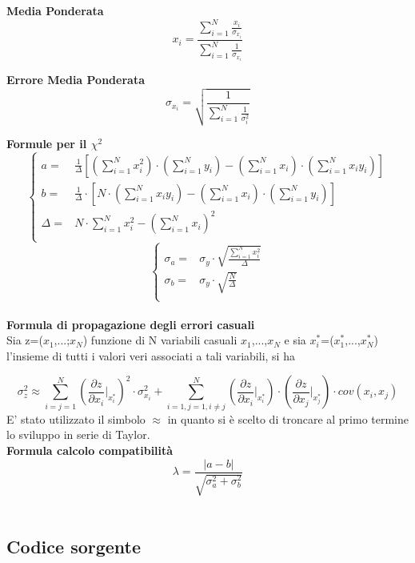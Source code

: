 \documentclass[a4paper,11pt,oneside]{article}
\begin{document}
\textbf{Media Ponderata}
\begin{equation*}
\label{eq:media_pond}
    x_i=\frac{\sum_{i=1}^{N}\frac{x_i}{\sigma_{x_i}}}{\sum_{i=1}^{N}\frac{1}{\sigma_{x_i}}}
\end{equation*}

\textbf{Errore Media Ponderata}
\begin{equation*}
\label{eq:errore_media_pond}
     \sigma_{x_i}=\sqrt{\frac{1}{\sum_{i=1}^{N}\frac{1}{\sigma_{i}^{2}}}}
\end{equation*}

\textbf{Formule per il ${\chi}^2$}
\begin{equation*}
        \begin{cases}
    a=&\frac{1}{\Delta}[(\sum\limits_{i=1}^{N}{x_{i}^{2}})\cdot(\sum\limits_{i=1}^{N}{y_{i}})-(\sum\limits_{i=1}^{N}{x_{i}})\cdot(\sum\limits_{i=1}^{N}{x_{i}y_{i}})] \\ 
    b=&\frac{1}{\Delta }\cdot \left [N\cdot \left ( \sum\limits_{i=1}^{N}x_i y_i \right )-\left ( \sum\limits_{i=1}^{N}x_i \right )\cdot \left ( \sum\limits_{i=1}^{N}y_i \right )  \right ]\\
    \Delta=& N\cdot \sum\limits_{i=1}^{N} x_i^{2} - \left ( \sum\limits_{i=1}^{N}x_i \right )^{2}\\
    \end{cases}
\end{equation*}
\begin{equation*}
    \begin{cases}
    \sigma_{a}=&\sigma_{y}\cdot\sqrt{\frac{\sum_{i=1}^{N}{x_{i}^{2}}}{\Delta}} \\
    \sigma_{b}=&\sigma_y\cdot \sqrt{\frac{N}{\Delta }}\\
    \end{cases}
    \label{equation:err_chi_quadro}
\end{equation*}
\\
\textbf{Formula di propagazione degli errori casuali}\\

Sia z=($x_1$,...;$x_N$) funzione di N variabili casuali $x_1$,...,$x_N$ e sia ${x_i^\ast}$=($x_1^\ast$,...,$x_N^{\ast}$) l'insieme di tutti i valori veri associati a tali variabili, si ha 

\begin{equation*}
    \sigma_z^{2}\approx  \sum_{i=j=1}^{N}\left ( \frac{\partial z}{\partial x_i}\Big|_{x_i^{\ast}} \right )^{2}\cdot\sigma_{x_i}^{2} +\sum_{i=1,j=1,i\neq j}^{N}\left (\frac{\partial z }{\partial x_i}\Big|_{x_i^{\ast}} \right ) \cdot \left ( \frac{\partial z}{\partial x_j} \Big|_{x_j^{\ast}} \right )\cdot cov(x_i,x_j)\label{eq:prop_errori}
\end{equation*}
E' stato utilizzato il simbolo $\approx$ in quanto si è scelto di troncare al primo termine lo sviluppo in serie di Taylor.\\


\textbf{Formula calcolo compatibilità}\\
\begin{equation*}
    \lambda=\frac{\left|a-b\right|}{\sqrt{\sigma^{2}_{a}+\sigma^{2}_{b}}}
\end{equation*}\\

\subsection{Codice sorgente}
\end{document}
